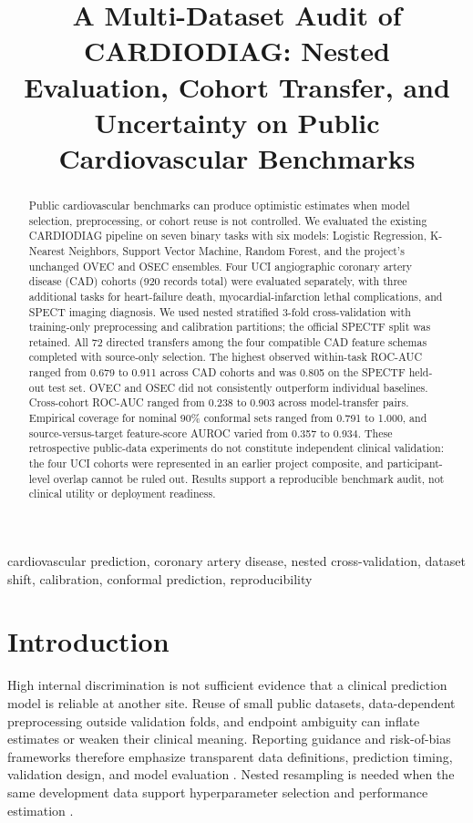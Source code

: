 \documentclass[conference]{IEEEtran}
\title{A Multi-Dataset Audit of CARDIODIAG: Nested Evaluation, Cohort Transfer, and Uncertainty on Public Cardiovascular Benchmarks}
\author{\IEEEauthorblockN{Akhil Preetham E, Ch Hari Krishna, and G Vennela}
\IEEEauthorblockA{Department of Computer Science and Engineering\\
Prasad V. Potluri Siddhartha Institute of Technology, Vijayawada, India\\
\textit{Author order, individual affiliations, contributions, and declarations require confirmation}}}
\begin{document}
\maketitle

\begin{abstract}
Public cardiovascular benchmarks can produce optimistic estimates when model selection, preprocessing, or cohort reuse is not controlled. We evaluated the existing CARDIODIAG pipeline on seven binary tasks with six models: Logistic Regression, K-Nearest Neighbors, Support Vector Machine, Random Forest, and the project’s unchanged OVEC and OSEC ensembles. Four UCI angiographic coronary artery disease (CAD) cohorts (920 records total) were evaluated separately, with three additional tasks for heart-failure death, myocardial-infarction lethal complications, and SPECT imaging diagnosis. We used nested stratified 3-fold cross-validation with training-only preprocessing and calibration partitions; the official SPECTF split was retained. All 72 directed transfers among the four compatible CAD feature schemas completed with source-only selection. The highest observed within-task ROC-AUC ranged from 0.679 to 0.911 across CAD cohorts and was 0.805 on the SPECTF held-out test set. OVEC and OSEC did not consistently outperform individual baselines. Cross-cohort ROC-AUC ranged from 0.238 to 0.903 across model-transfer pairs. Empirical coverage for nominal 90\% conformal sets ranged from 0.791 to 1.000, and source-versus-target feature-score AUROC varied from 0.357 to 0.934. These retrospective public-data experiments do not constitute independent clinical validation: the four UCI cohorts were represented in an earlier project composite, and participant-level overlap cannot be ruled out. Results support a reproducible benchmark audit, not clinical utility or deployment readiness.
\end{abstract}

\begin{IEEEkeywords}
cardiovascular prediction, coronary artery disease, nested cross-validation, dataset shift, calibration, conformal prediction, reproducibility
\end{IEEEkeywords}

\section{Introduction}
High internal discrimination is not sufficient evidence that a clinical prediction model is reliable at another site. Reuse of small public datasets, data-dependent preprocessing outside validation folds, and endpoint ambiguity can inflate estimates or weaken their clinical meaning. Reporting guidance and risk-of-bias frameworks therefore emphasize transparent data definitions, prediction timing, validation design, and model evaluation \cite{collins2024tripodai,moons2025probastai}. Nested resampling is needed when the same development data support hyperparameter selection and performance estimation \cite{varma2006bias,cawley2010overfitting}.
\end{document}
